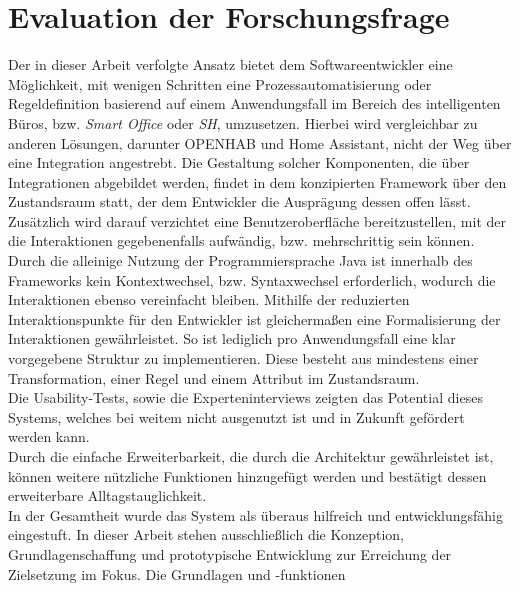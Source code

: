 \section{Evaluation der Forschungsfrage}
    Der in dieser Arbeit verfolgte Ansatz bietet dem Softwareentwickler eine Möglichkeit, mit wenigen Schritten eine 
    Prozessautomatisierung oder Regeldefinition basierend auf einem Anwendungsfall im Bereich des intelligenten 
    Büros, bzw. \textit{Smart Office} oder \textit{\acl{SH}}, umzusetzen. Hierbei wird vergleichbar zu anderen 
    Lösungen, darunter \acs{OPENHAB} und Home Assistant, nicht der Weg über eine Integration angestrebt. 
    Die Gestaltung solcher Komponenten, die über Integrationen abgebildet werden, findet in dem konzipierten 
    Framework über den Zustandsraum statt, der dem Entwickler die Ausprägung dessen offen lässt. Zusätzlich 
    wird darauf verzichtet eine Benutzeroberfläche bereitzustellen, mit der die Interaktionen gegebenenfalls 
    aufwändig, bzw. mehrschrittig sein können. Durch die alleinige Nutzung der Programmiersprache Java ist innerhalb des 
    Frameworks kein Kontextwechsel, bzw. Syntaxwechsel erforderlich, wodurch die Interaktionen ebenso vereinfacht bleiben. 
    Mithilfe der reduzierten Interaktionspunkte für den Entwickler ist gleichermaßen eine Formalisierung der Interaktionen 
    gewährleistet. So ist lediglich pro Anwendungsfall eine klar vorgegebene Struktur zu implementieren. Diese besteht aus mindestens einer 
    Transformation, einer Regel und einem Attribut im Zustandsraum. 
    \\
    \linebreak
    Die Usability-Tests, sowie die Experteninterviews zeigten das Potential dieses Systems, welches bei weitem nicht ausgenutzt ist 
    und in Zukunft gefördert werden kann. 
    \\
    \linebreak
    Durch die einfache Erweiterbarkeit, die durch die Architektur gewährleistet ist, können weitere nützliche Funktionen hinzugefügt 
    werden und bestätigt dessen erweiterbare Alltagstauglichkeit. 
    \\
    In der Gesamtheit wurde das System als überaus hilfreich und entwicklungsfähig eingestuft. In dieser Arbeit stehen ausschließlich die 
    Konzeption, Grundlagenschaffung und prototypische Entwicklung zur Erreichung der Zielsetzung im Fokus. Die Grundlagen und -funktionen 
